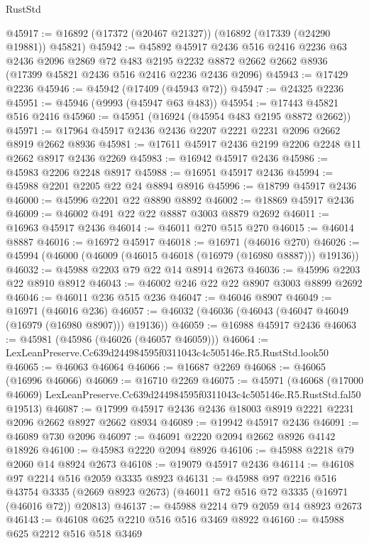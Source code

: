 \begin{lexlean}{RustStd}
\begin{coremodule}
@45917 := @16892 (@17372 (@20467 @21327)) (@16892 (@17339 (@24290 @19881)) @45821)
@45942 := @45892
    @45917
    @2436
    @516
    @2416
    @2236
    @63
    @2436
    @2096
    @2869
    @72
    @483
    @2195
    @2232
    @8872
    @2662
    @2662
    @8936
    (@17399 @45821 @2436 @516 @2416 @2236 @2436 @2096)
@45943 := @17429 @2236
@45946 := @45942 (@17409 (@45943 @72))
@45947 := @24325 @2236
@45951 := @45946 (@9993 (@45947 @63 @483))
@45954 := @17443 @45821 @516 @2416
@45960 := @45951 (@16924 (@45954 @483 @2195 @8872 @2662))
@45971 := @17964 @45917 @2436 @2436 @2207 @2221 @2231 @2096 @2662 @8919 @2662 @8936
@45981 := @17611 @45917 @2436 @2199 @2206 @2248 @11 @2662 @8917 @2436 @2269
@45983 := @16942 @45917 @2436
@45986 := @45983 @2206 @2248 @8917
@45988 := @16951 @45917 @2436
@45994 := @45988 @2201 @2205 @22 @24 @8894 @8916
@45996 := @18799 @45917 @2436
@46000 := @45996 @2201 @22 @8890 @8892
@46002 := @18869 @45917 @2436
@46009 := @46002 @491 @22 @22 @8887 @3003 @8879 @2692
@46011 := @16963 @45917 @2436
@46014 := @46011 @270 @515 @270
@46015 := @46014 @8887
@46016 := @16972 @45917
@46018 := @16971 (@46016 @270)
@46026 := @45994 (@46000 (@46009 (@46015 @46018 (@16979 (@16980 @8887))) @19136))
@46032 := @45988 @2203 @79 @22 @14 @8914 @2673
@46036 := @45996 @2203 @22 @8910 @8912
@46043 := @46002 @246 @22 @22 @8907 @3003 @8899 @2692
@46046 := @46011 @236 @515 @236
@46047 := @46046 @8907
@46049 := @16971 (@46016 @236)
@46057 := @46032 (@46036 (@46043 (@46047 @46049 (@16979 (@16980 @8907))) @19136))
@46059 := @16988 @45917 @2436
@46063 := @45981 (@45986 (@46026 (@46057 @46059)))
@46064 := LexLeanPreserve.Cc639d244984595f0311043c4c505146e.R5.RustStd.look50
@46065 := @46063 @46064
@46066 := @16687 @2269
@46068 := @46065 (@16996 @46066)
@46069 := @16710 @2269
@46075 := @45971
    (@46068
      (@17000 @46069)
      LexLeanPreserve.Cc639d244984595f0311043c4c505146e.R5.RustStd.fal50
      @19513)
@46087 := @17999 @45917 @2436 @2436 @18003 @8919 @2221 @2231 @2096 @2662 @8927 @2662 @8934
@46089 := @19942 @45917 @2436
@46091 := @46089 @730 @2096
@46097 := @46091 @2220 @2094 @2662 @8926 @4142 @18926
@46100 := @45983 @2220 @2094 @8926
@46106 := @45988 @2218 @79 @2060 @14 @8924 @2673
@46108 := @19079 @45917 @2436
@46114 := @46108 @97 @2214 @516 @2059 @3335 @8923
@46131 := @45988
    @97
    @2216
    @516
    @43754
    @3335
    (@2669 @8923 @2673)
    (@46011 @72 @516 @72 @3335 (@16971 (@46016 @72)) @20813)
@46137 := @45988 @2214 @79 @2059 @14 @8923 @2673
@46143 := @46108 @625 @2210 @516 @516 @3469 @8922
@46160 := @45988
    @625
    @2212
    @516
    @518
    @3469

\end{coremodule}
\end{lexlean}
